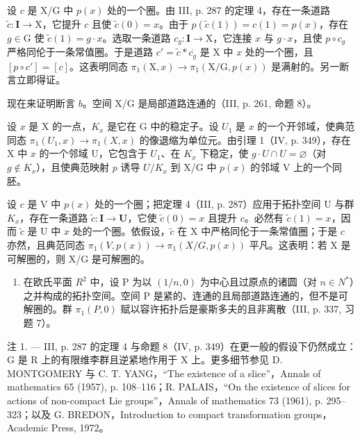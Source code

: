 设 \(c\) 是 X/G 中 \(p(x)\) 处的一个圈。由 III, p. 287 的定理 4，存在一条道路 \(\widetilde{c} \colon \mathbf{I} \to \mathrm{X}\)，它提升 \(c\) 且使 \(\widetilde{c}(0) = x\)。由于 \(p(\widetilde{c}(1)) = c(1) = p(x)\)，存在 \(g \in \mathrm{G}\) 使 \(\widetilde{c}(1) = g \cdot x\)。选取一条道路 \(c_g \colon \mathbf{I} \to \mathrm{X}\)，它连接 \(x\) 与 \(g \cdot x\)，且使 \(p \circ c_g\) 严格同伦于一条常值圈。于是道路 \(c' = \widetilde{c} * \overline{c_g}\) 是 X 中 \(x\) 处的一个圈，且 \([p \circ c'] = [c]\)。这表明同态 \(\pi_1(\mathrm{X}, x) \to \pi_1(\mathrm{X/G}, p(x))\) 是满射的。另一断言立即得证。

现在来证明断言 \(b\)。空间 X/G 是局部道路连通的（III, p. 261, 命题 8）。

设 \(x\) 是 X 的一点，\(K_x\) 是它在 G 中的稳定子。设 \(U_1\) 是 \(x\) 的一个开邻域，使典范同态 \(\pi_1(U_1, x) \to \pi_1(X, x)\) 的像退缩为单位元。由引理 1（IV, p. 349），存在 X 中 \(x\) 的一个邻域 U，它包含于 \(U_1\)、在 \(K_x\) 下稳定，使 \(g \cdot U \cap U = \varnothing\)（对 \(g \notin K_x\)），且使典范映射 \(p\) 诱导 \(U/K_x\) 到 X/G 中 \(p(x)\) 的邻域 V 上的一个同胚。

设 \(c\) 是 V 中 \(p(x)\) 处的一个圈；把定理 4（III, p. 287）应用于拓扑空间 U 与群 \(K_x\)，存在一条道路 \(\widetilde{c} \colon \mathbf{I} \to \mathbf{U}\)，它使 \(\widetilde{c}(0) = x\) 且提升 \(c\)。必然有 \(\widetilde{c}(1) = x\)，因而 \(\widetilde{c}\) 是 U 中 \(x\) 处的一个圈。依假设，\(\widetilde{c}\) 在 X 中严格同伦于一条常值圈；于是 \(c\) 亦然，且典范同态 \(\pi_1(V, p(x)) \to \pi_1(X/G, p(x))\) 平凡。这表明：若 X 是可解圈的，则 X/G 是可解圈的。

\begin{enumerate}
\def\labelenumi{\arabic{enumi})}
\setcounter{enumi}{4}
\tightlist
\item
  在欧氏平面 \(R^{2}\) 中，设 P 为以 \((1/n,0)\) 为中心且过原点的诸圆（对 \(n \in N^{*}\)）之并构成的拓扑空间。空间 P 是紧的、连通的且局部道路连通的，但不是可解圈的。群 \(\pi_{1}(P,0)\) 赋以容许拓扑后是豪斯多夫的且非离散（III, p. 337, 习题 7）。
\end{enumerate}

注 1. --- III, p. 287 的定理 4 与命题 8（IV, p. 349）在更一般的假设下仍然成立：G 是 R 上的有限维李群且逆紧地作用于 X 上。更多细节参见 D. MONTGOMERY 与 C. T. YANG，“The existence of a slice”，Annals of mathematics 65 (1957), p. 108--116；R. PALAIS，“On the existence of slices for actions of non-compact Lie groups”，Annals of mathematics 73 (1961), p. 295--323；以及 G. BREDON，Introduction to compact transformation groups，Academic Press, 1972。

